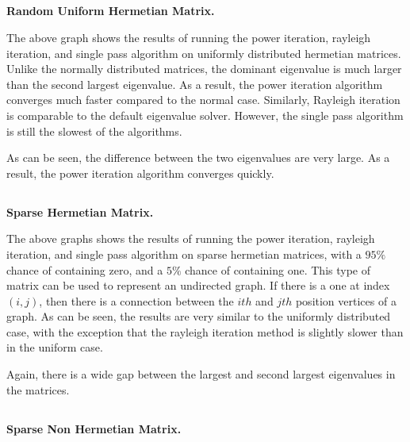 \documentclass[11pt]{amsart}
\begin{document}
\subsection{} \textbf{Random Uniform Hermetian Matrix.}


The above graph shows the results of running the power iteration, rayleigh iteration, and single pass algorithm on uniformly distributed hermetian matrices. Unlike the normally distributed matrices, the dominant eigenvalue is much larger than the second largest eigenvalue. As a result, the power iteration algorithm converges much faster compared to the normal case. Similarly, Rayleigh iteration is comparable to the default eigenvalue solver. However, the single pass algorithm is still the slowest of the algorithms.


As can be seen, the difference between the two eigenvalues are very large. As a result, the power iteration algorithm converges quickly.

\subsection{} \textbf{Sparse Hermetian Matrix.}


The above graphs shows the results of running the power iteration, rayleigh iteration, and single pass algorithm on sparse hermetian matrices, with a $95\%$ chance of containing zero, and a $5\%$ chance of containing one. This type of matrix can be used to represent an undirected graph. If there is a one at index $(i,j)$, then there is a connection between the $ith$ and $jth$ position vertices of a graph. As can be seen, the results are very similar to the uniformly distributed case, with the exception that the rayleigh iteration method is slightly slower than in the uniform case.


Again, there is a wide gap between the largest and second largest eigenvalues in the matrices.

\subsection{} \textbf{Sparse Non Hermetian Matrix.}
\end{document}
